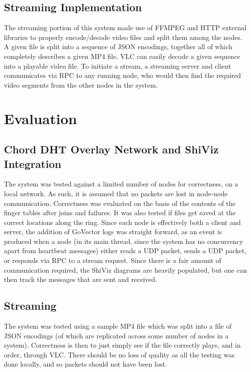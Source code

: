\documentclass[fleqn,24pt]{SelfArx} %
\begin{document}
\subsection{Streaming Implementation}

The streaming portion of this system made use of FFMPEG and HTTP external libraries to properly encode/decode video files and split them among the nodes. A given file is split into a sequence of JSON encodings, together all of which completely describes a given MP4 file. VLC can easily decode a given sequence into a playable video file. To initiate a stream, a streaming server and client communicates via RPC to any running node, who would then find the required video segments from the other nodes in the system. 

\section{Evaluation}

\subsection{Chord DHT Overlay Network and ShiViz Integration}

The system was tested against a limited number of nodes for correctness, on a local network. As such, it is assumed that no packets are lost in node-node communication. Correctness was evaluated on the basis of the contents of the finger tables after joins and failures. It was also tested if files get saved at the correct locations along the ring. Since each node is effectively both a client and server, the addition of GoVector logs was straight forward, as an event is produced when a node (in its main thread, since the system has no concurrency apart from heartbeat messages) either reads a UDP packet, sends a UDP packet, or responds via RPC to a stream request. Since there is a fair amount of communication required, the ShiViz diagrams are heavily populated, but one can then track the messages that are sent and received.

\subsection{Streaming}

The system was tested using a sample MP4 file which was split into a file of JSON encodings (of which are replicated across some number of nodes in a system). Correctness is then to just simply see if the file correctly plays, and in order, through VLC. There should be no loss of quality as all the testing was done locally, and so packets should not have been lost. 
\end{document}
